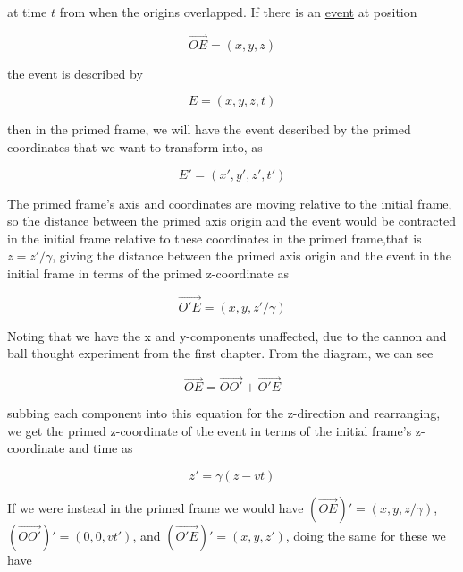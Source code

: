 at time ${t}$ from when the origins overlapped.
If there is an \hyperlink{def-event}{event} at position

\begin{equation}
	\vec{OE} = ({x},{y},{z})
\end{equation}

the event is described by

\begin{equation}
	E = ({x},{y},{z},{t})
\end{equation}

then in the primed frame, we will have  the event described by the primed coordinates that we want to transform into, as

\begin{equation}
	E{'} = ({x{'}},{y{'}},{z{'}},t{'})
\end{equation}

The primed frame's axis and coordinates are moving relative to the initial frame, so the distance between the primed axis origin and the event would be contracted in the initial frame relative to these coordinates in the primed frame,that is ${z} = {z{'}}/{\gamma}$, giving the distance between the primed axis origin and the event in the initial frame in terms of the primed z-coordinate as

\begin{equation}
	\vec{O{'}E} = (x,y,{z{'}}/{\gamma})
\end{equation}

Noting that we have the x and y-components unaffected, due to the cannon and ball thought experiment from the first chapter.
From the diagram, we can see

\begin{equation}
	\vec{OE} = \vec{OO{'}} + \vec{O{'}E}
	\label{eq: event}
\end{equation}

subbing each component into this equation for the z-direction and rearranging, we get the primed z-coordinate of the event in terms of the initial frame's z-coordinate and time as

\begin{equation}
	{z{'}} = {\gamma} ({z}-{v}{t})
\end{equation}

If we were instead in the primed frame we would have ${(\vec{OE}){'}} = ({x},{y},{z}/{\gamma})$, ${(\vec{OO{'}}){'}} = (0,0,{v}{t{'}})$, and ${(\vec{O{'}E}){'}} = (x,y,{z{'}})$, doing the same for these we have

